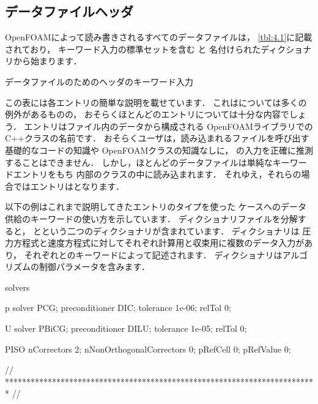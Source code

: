 \subsection{データファイルヘッダ}
\label{ssec:4.2.3}
OpenFOAMによって読み書きされるすべてのデータファイルは，
\autoref{tbl:4.1}に記載されており，
キーワード入力の標準セットを含む
%
%
と
名付けられたディクショナリから始まります．


\begin{table}[ht]
 
 \caption{データファイルのためのヘッダのキーワード入力}
 \label{tbl:4.1}
\end{table}


この表には各エントリの簡単な説明を載せています．
これはについては多くの例外があるものの，
おそらくほとんどのエントリについては十分な内容でしょう．
エントリはファイル内のデータから構成される
OpenFOAMライブラリでのC++クラスの名前です．
おそらくユーザは，読み込まれるファイルを呼び出す基礎的なコードの知識や
OpenFOAMクラスの知識なしに，
の入力を正確に推測することはできません．
しかし，ほとんどのデータファイルは単純なキーワードエントリをもち
内部のクラスの中に読み込まれます．
それゆえ，それらの場合ではエントリはとなります．

以下の例はこれまで説明してきたエントリのタイプを使った
ケースへのデータ供給のキーワードの使い方を示しています．
ディクショナリファイルを分解すると，
とという二つのディクショナリが含まれています．
ディクショナリは
圧力方程式と速度方程式に対してそれぞれ計算用と収束用に複数のデータ入力があり，
それぞれとのキーワードによって記述されます．
ディクショナリはアルゴリズムの制御パラメータを含みます．
\begin{OFverbatim}[file, linenum=17]

solvers
{
    p
    {
        solver           PCG;
        preconditioner   DIC;
        tolerance        1e-06;
        relTol           0;
    }

    U
    {
        solver           PBiCG;
        preconditioner   DILU;
        tolerance        1e-05;
        relTol           0;
    }
}

PISO
{
    nCorrectors     2;
    nNonOrthogonalCorrectors 0;
    pRefCell        0;
    pRefValue       0;
}


// ************************************************************************* //
\end{OFverbatim}



